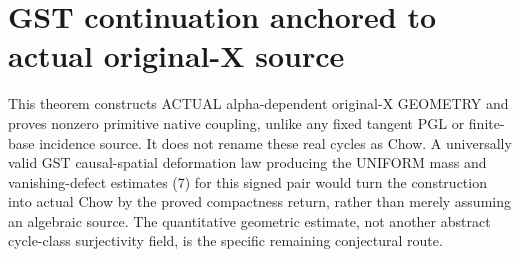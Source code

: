 \documentclass[11pt]{article}
\begin{document}
\section{GST continuation anchored to actual original-X source}
This theorem constructs ACTUAL alpha-dependent
original-X GEOMETRY and proves nonzero
primitive native coupling, unlike any
fixed tangent PGL or finite-base incidence
source. It does not rename these real
cycles as Chow. A universally valid GST
causal-spatial deformation law producing
the UNIFORM mass and vanishing-defect
estimates (7) for this signed pair would
turn the construction into actual Chow
by the proved compactness return, rather
than merely assuming an algebraic source.
The quantitative geometric estimate,
not another abstract cycle-class
surjectivity field, is the specific
remaining conjectural route.
\end{document}
